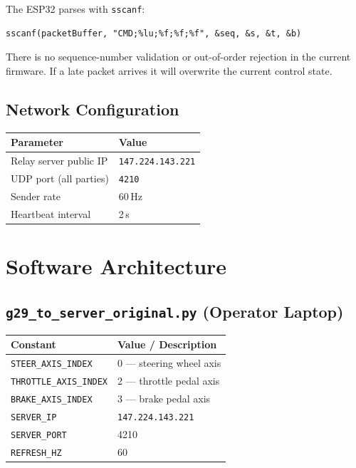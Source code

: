 \documentclass[12pt, letterpaper]{article}
\begin{document}
The ESP32 parses with \texttt{sscanf}:

\begin{lstlisting}[style=cpp]
sscanf(packetBuffer, "CMD;%lu;%f;%f;%f", &seq, &s, &t, &b)
\end{lstlisting}

There is no sequence-number validation or out-of-order rejection in the current
firmware.  If a late packet arrives it will overwrite the current control state.

\subsection{Network Configuration}

\begin{center}
\begin{tabular}{ll}
  \toprule
  \textbf{Parameter} & \textbf{Value} \\
  \midrule
  Relay server public IP & \texttt{147.224.143.221} \\
  UDP port (all parties) & \texttt{4210} \\
  Sender rate            & 60\,Hz \\
  Heartbeat interval     & 2\,s \\
  \bottomrule
\end{tabular}
\end{center}

\section{Software Architecture}

\subsection{\texttt{g29\_to\_server\_original.py} (Operator Laptop)}

\begin{center}
\begin{tabular}{ll}
  \toprule
  \textbf{Constant}          & \textbf{Value / Description} \\
  \midrule
  \texttt{STEER\_AXIS\_INDEX}    & 0 --- steering wheel axis \\
  \texttt{THROTTLE\_AXIS\_INDEX} & 2 --- throttle pedal axis \\
  \texttt{BRAKE\_AXIS\_INDEX}    & 3 --- brake pedal axis \\
  \texttt{SERVER\_IP}           & \texttt{147.224.143.221} \\
  \texttt{SERVER\_PORT}         & 4210 \\
  \texttt{REFRESH\_HZ}          & 60 \\
  \bottomrule
\end{tabular}
\end{center}
\end{document}
